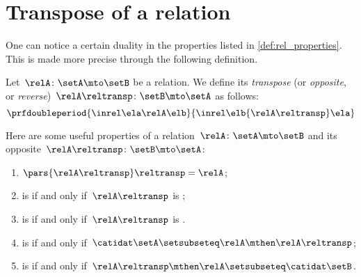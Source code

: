 
\section{Transpose of a relation}

One can notice a certain duality in the properties listed in \cref{def:rel_properties}.
This is made more precise through the following definition.

\begin{ctdefinition}
    \label{def:relation-transpose}
    Let~$\relA\colon \setA\mto \setB$ be a relation.
    We define its \emph{transpose} (or \emph{opposite}, or \emph{reverse})~$\relA\reltransp\colon \setB \mto \setA$ as follows:
    \begin{equation}
        \prfdoubleperiod{
            \inrel \ela \relA \elb
        }{
            \inrel \elb {\relA\reltransp} \ela
        }
    \end{equation}
\end{ctdefinition}
\begin{remark}
    \label{re:rel-op-properties}
    Here are some useful properties of a relation~$\relA\colon \setA \mto \setB$ and its opposite~$\relA\reltransp\colon \setB \mto \setA$:
    \begin{enumerate}
        \item $\pars{\relA\reltransp} \reltransp = \relA $;
        \item \relA is  if and only if~$\relA\reltransp$ is ;
        \item \relA is  if and only if~$\relA\reltransp$ is .
        \item \relA is  if and only if~$\catidat\setA\setsubseteq \relA \mthen \relA\reltransp$;
        \item \relA is  if and only if~$\relA\reltransp\mthen \relA\setsubseteq \catidat\setB$.
    \end{enumerate}
\end{remark}

\begin{marginfigure}
    \centering
    \caption{}
    \label{fig:rel_transpose}
\end{marginfigure}

